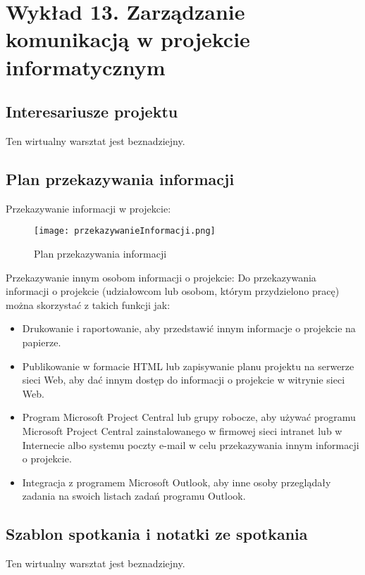 \chapter{Wykład 13. Zarządzanie komunikacją w projekcie informatycznym}

\section{Interesariusze projektu}

Ten wirtualny warsztat jest beznadziejny.


\section{Plan przekazywania informacji}

Przekazywanie informacji w projekcie: 

\begin{figure}[!h]
\centering
\texttt{[image: przekazywanieInformacji.png]}
\caption{Plan przekazywania informacji}
\label{fig:przekazywanieInformacji}
\end{figure}

\clearpage

Przekazywanie innym osobom informacji o projekcie:
 Do przekazywania informacji o projekcie (udziałowcom lub osobom, którym przydzielono pracę) można skorzystać z takich funkcji jak:
\begin{itemize}
\item Drukowanie i raportowanie, aby przedstawić innym informacje o projekcie na papierze. 
\item Publikowanie w formacie HTML lub zapisywanie planu projektu na serwerze sieci Web, aby dać innym dostęp do informacji o projekcie w witrynie sieci Web. 
\item Program Microsoft Project Central lub grupy robocze, aby używać programu Microsoft Project Central zainstalowanego w firmowej sieci intranet lub w Internecie albo systemu poczty e-mail w celu przekazywania innym informacji o projekcie. 
\item Integracja z programem Microsoft Outlook, aby inne osoby przeglądały zadania na swoich listach zadań programu Outlook.
\end{itemize}



\section{Szablon spotkania i notatki ze spotkania}

Ten wirtualny warsztat jest beznadziejny.


